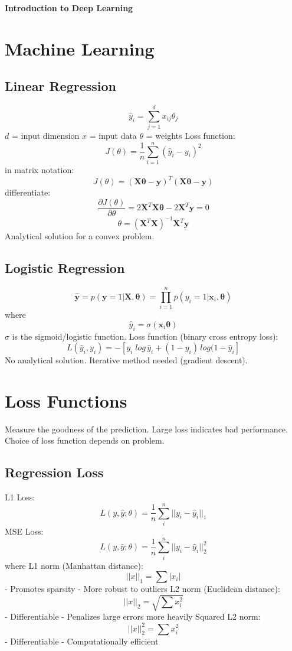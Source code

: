 \documentclass{scrartcl}
\begin{document}
\onehalfspacing
\obeylines
\setlength{\parindent}{0pt}
\begin{center}\LARGE\textbf{Introduction to Deep Learning}\end{center}


\section*{Machine Learning}
\subsection*{Linear Regression}
$$\hat{y}_i = \sum_{j=1}^{d} x_{ij} \theta_j$$
$d$ = input dimension
$x$ = input data
$\theta$ = weights
Loss function:
$$J(\theta) = \frac{1}{n} \sum_{i=1}^{n} (\hat{y}_i - y_i)^2$$
in matrix notation:
$$J(\theta) = (\mathbf{X\theta} - \mathbf{y})^T(\mathbf{X\theta} - \mathbf{y})$$
differentiate:
$$\frac{\partial J(\theta)}{\partial \theta} = 2\mathbf{X}^T\mathbf{X\theta} - 2\mathbf{X}^T\mathbf{y} = 0$$
$$\theta = (\mathbf{X}^T\mathbf{X})^{-1}\mathbf{X}^T\mathbf{y}$$
Analytical solution for a convex problem.

\subsection*{Logistic Regression}
$$\mathbf{\hat{y}} = p(\mathbf{y} = 1 | \mathbf{X}, \mathbf{\theta}) = \prod_{i=1}^{n} p(y_i = 1 | \mathbf{x}_i, \mathbf{\theta})$$
where
$$\hat{y}_i = \sigma(\mathbf{x}_i\mathbf{\theta})$$
$\sigma$ is the sigmoid/logistic function.
Loss function (binary cross entropy loss):
$$L(\hat{y}_i, y_i) = -[y_i \; log \, \hat{y}_i + (1 - y_i) \, log(1 - \hat{y}_i]$$
No analytical solution. Iterative method needed (gradient descent).


\section*{Loss Functions}
Measure the goodness of the prediction.
Large loss indicates bad performance.
Choice of loss function depends on problem.

\subsection*{Regression Loss}
L1 Loss:
$$L(y, \hat{y}; \theta) = \frac{1}{n} \sum_{i}^{n} ||y_i - \hat{y}_i ||_1$$
MSE Loss:
$$L(y, \hat{y}; \theta) = \frac{1}{n} \sum_{i}^{n} ||y_i - \hat{y}_i ||_2^2$$
where 
L1 norm (Manhattan distance):
$$||x||_1 = \sum |x_i|$$
- Promotes sparsity
- More robust to outliers
L2 norm (Euclidean distance):
$$||x||_2 = \sqrt{\sum x^2_i}$$
- Differentiable
- Penalizes large errors more heavily
Squared L2 norm:
$$||x||^2_2 = \sum x^2_i$$
- Differentiable
- Computationally efficient
\end{document}
